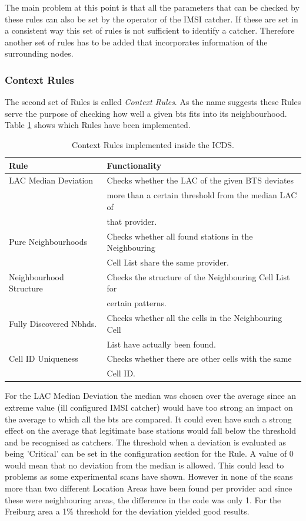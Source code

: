 The main problem at this point is that all the parameters that can be checked by these rules can also be set by the operator of the IMSI catcher.
If these are set in a consistent way this set of rules is not sufficient to identify a catcher.
Therefore another set of rules has to be added that incorporates information of the surrounding nodes.

\subsubsection{Context Rules}
The second set of Rules is called \emph{Context Rules}.
As the name suggests these Rules serve the purpose of checking how well a given \gls{bts} fits into its neighbourhood.
Table \ref{tab:context_rules} shows which Rules have been implemented.
\begin{table}
\centering
\begin{tabular}{ll}
\toprule
Rule					&Functionality\\
\midrule
LAC Median Deviation	&Checks whether the LAC of the given BTS deviates\\
						&more than a certain threshold from the median LAC of\\
						&that provider.\\
Pure Neighbourhoods		&Checks whether all found stations in the Neighbouring\\
						&Cell List share the same provider.\\
Neighbourhood Structure	&Checks the structure of the Neighbouring Cell List for\\
						&certain patterns.\\
Fully Discovered Nbhds. &Checks whether all the cells in the Neighbouring Cell\\
						&List have actually been found.\\
Cell ID Uniqueness 		&Checks whether there are other cells with the same\\
						&Cell ID.\\
\bottomrule
\end{tabular}
\caption{Context Rules implemented inside the ICDS.}
\label{tab:context_rules}
\end{table}

For the LAC Median Deviation the median was chosen over the average since an extreme value (ill configured IMSI catcher) would have too strong an impact on the average to which all the \gls{bts} are compared.
It could even have such a strong effect on the average that legitimate base stations would fall below the threshold and be recognised as catchers.
The threshold when a deviation is evaluated as being 'Critical' can be set in the configuration section for the Rule.
A value of 0 would mean that no deviation from the median is allowed.
This could lead to problems as some experimental scans have shown.
However in none of the scans more than two different Location Areas have been found per provider and since these were neighbouring areas, the difference in the code was only 1.
For the Freiburg area a 1\% threshold for the deviation yielded good results.

